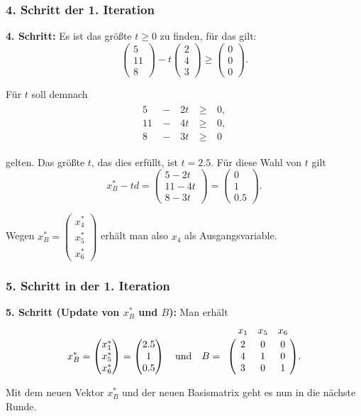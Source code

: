 \documentclass[smaller]{beamer}
\begin{document}
\begin{frame}
 \frametitle{4. Schritt der 1. Iteration}
{\textbf{4. Schritt:}} Es ist das größte $t \geq 0$ zu finden, für das gilt:
\[
\begin{pmatrix} 5 \\ 11 \\ 8 \end{pmatrix} - t \begin{pmatrix} 2 \\ 4 \\ 3 \end{pmatrix} \geq \begin{pmatrix} 0 \\ 0 \\ 0 \end{pmatrix}.
\]

Für $t$ soll demnach
\begin{align*}
\begin{alignedat}{3}
 5 &\ - &\ 2t &\ \geq &\ 0, \\
11 &\ - &\ 4t &\ \geq &\ 0, \\
 8 &\ - &\ 3t &\ \geq &\ 0\
\end{alignedat}
\end{align*}

gelten. Das größte $t$, das dies erfüllt, ist $t=2.5$. Für diese Wahl von $t$ gilt
\[
x_B^* - td = \begin{pmatrix} 5-2t \\ 11-4t \\ 8-3t \end{pmatrix} = \begin{pmatrix} 0 \\ 1 \\ 0.5 \end{pmatrix}.
\]

Wegen $x_B^* = \begin{pmatrix} x_4^* \\ x_5^* \\ x_6^* \end{pmatrix}$ erhält man also $x_4$ als Ausgangsvariable.
\end{frame}

\begin{frame}
 \frametitle{5. Schritt in der 1. Iteration}
 \textbf{5. Schritt (Update von $x_B^*$ und $B$):}
Man erhält
\[
x_B^* = \begin{pmatrix} x_1^* \\ x_5^* \\ x_6^* \end{pmatrix} = \begin{pmatrix} 2.5 \\ 1 \\ 0.5 \end{pmatrix} \quad \text{und} \quad
B = \bordermatrix{ & x_1 & x_5 & x_6 \cr & 2 & 0 & 0 \cr & 4 & 1 & 0 \cr & 3 & 0 & 1 }. 
\]

Mit dem neuen Vektor $x_B^*$ und der neuen Basismatrix geht es nun in die nächste Runde.
\end{frame}
\end{document}
